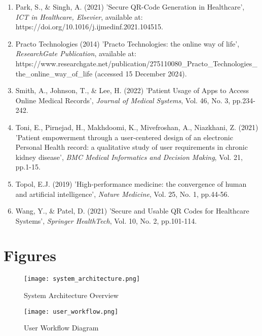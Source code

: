 \documentclass[12pt,a4paper]{article}
\begin{document}
\begin{enumerate}
\item Park, S., \& Singh, A. (2021) 'Secure QR-Code Generation in Healthcare', \textit{ICT in Healthcare, Elsevier}, available at: https://doi.org/10.1016/j.ijmedinf.2021.104515.

\item Practo Technologies (2014) 'Practo Technologies: the online way of life', \textit{ResearchGate Publication}, available at: https://www.researchgate.net/publication/275110080\_Practo\_Technologies\_the\_online\_way\_of\_life (accessed 15 December 2024).

\item Smith, A., Johnson, T., \& Lee, H. (2022) 'Patient Usage of Apps to Access Online Medical Records', \textit{Journal of Medical Systems}, Vol. 46, No. 3, pp.234-242.

\item Toni, E., Pirnejad, H., Makhdoomi, K., Mivefroshan, A., Niazkhani, Z. (2021) 'Patient empowerment through a user-centered design of an electronic Personal Health record: a qualitative study of user requirements in chronic kidney disease', \textit{BMC Medical Informatics and Decision Making}, Vol. 21, pp.1-15.

\item Topol, E.J. (2019) 'High-performance medicine: the convergence of human and artificial intelligence', \textit{Nature Medicine}, Vol. 25, No. 1, pp.44-56.

\item Wang, Y., \& Patel, D. (2021) 'Secure and Usable QR Codes for Healthcare Systems', \textit{Springer HealthTech}, Vol. 10, No. 2, pp.101-114.

\end{enumerate}

\newpage

\section{Figures}

\begin{figure}[H]
\centering
\texttt{[image: system\_architecture.png]}
\caption{System Architecture Overview}
\label{fig:architecture}
\end{figure}

\begin{figure}[H]
\centering
\texttt{[image: user\_workflow.png]}
\caption{User Workflow Diagram}
\label{fig:workflow}
\end{figure}
\end{document}
